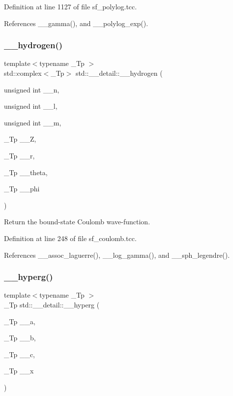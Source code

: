 Definition at line 1127 of file sf\+\_\+polylog.\+tcc.



References \+\_\+\+\_\+gamma(), and \+\_\+\+\_\+polylog\+\_\+exp().

\mbox{\label{namespacestd_1_1____detail_aba60bcf9f002dc900042065999546bc9}} 
\subsubsection{\texorpdfstring{\+\_\+\+\_\+hydrogen()}{\_\_hydrogen()}}
{\footnotesize\ttfamily template$<$typename \+\_\+\+Tp $>$ \\
std\+::complex$<$\+\_\+\+Tp$>$ std\+::\+\_\+\+\_\+detail\+::\+\_\+\+\_\+hydrogen (\begin{DoxyParamCaption}\item[{unsigned int}]{\+\_\+\+\_\+n,  }\item[{unsigned int}]{\+\_\+\+\_\+l,  }\item[{unsigned int}]{\+\_\+\+\_\+m,  }\item[{\+\_\+\+Tp}]{\+\_\+\+\_\+Z,  }\item[{\+\_\+\+Tp}]{\+\_\+\+\_\+r,  }\item[{\+\_\+\+Tp}]{\+\_\+\+\_\+theta,  }\item[{\+\_\+\+Tp}]{\+\_\+\+\_\+phi }\end{DoxyParamCaption})}

Return the bound-\/state Coulomb wave-\/function. 

Definition at line 248 of file sf\+\_\+coulomb.\+tcc.



References \+\_\+\+\_\+assoc\+\_\+laguerre(), \+\_\+\+\_\+log\+\_\+gamma(), and \+\_\+\+\_\+sph\+\_\+legendre().

\mbox{\label{namespacestd_1_1____detail_a316589a60d5e5f50201c2d42b980678c}} 
\subsubsection{\texorpdfstring{\+\_\+\+\_\+hyperg()}{\_\_hyperg()}}
{\footnotesize\ttfamily template$<$typename \+\_\+\+Tp $>$ \\
\+\_\+\+Tp std\+::\+\_\+\+\_\+detail\+::\+\_\+\+\_\+hyperg (\begin{DoxyParamCaption}\item[{\+\_\+\+Tp}]{\+\_\+\+\_\+a,  }\item[{\+\_\+\+Tp}]{\+\_\+\+\_\+b,  }\item[{\+\_\+\+Tp}]{\+\_\+\+\_\+c,  }\item[{\+\_\+\+Tp}]{\+\_\+\+\_\+x }\end{DoxyParamCaption})}



